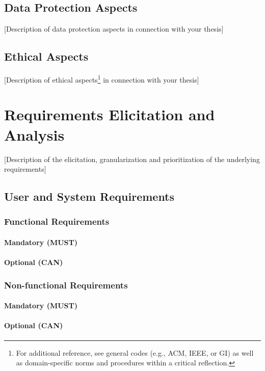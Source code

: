 \documentclass[oneside,bibliography=totocnumbered,BCOR=5mm]{scrbook}
\begin{document}
\section{Data Protection Aspects}
[Description of data protection aspects in connection with your thesis]

\section{Ethical Aspects}
[Description of ethical aspects\footnote{For additional reference, see general codes (e.g., ACM, IEEE, or GI) as well as domain-specific norms and procedures within a critical reflection.} in connection with your thesis]

\chapter{Requirements Elicitation and Analysis}
[Description of the elicitation, granularization and prioritization of the underlying requirements]

\section{User and System Requirements}

\subsection{Functional Requirements}

\subsubsection{Mandatory (MUST)}

\subsubsection{Optional (CAN)}

\subsection{Non-functional Requirements}

\subsubsection{Mandatory (MUST)}

\subsubsection{Optional (CAN)}
\end{document}
